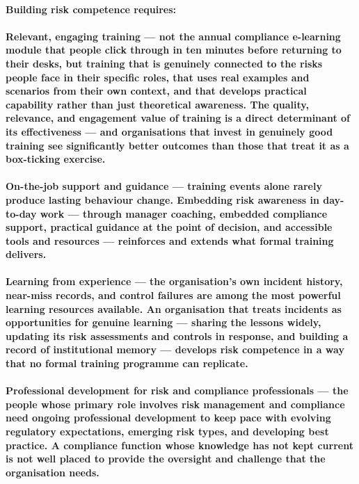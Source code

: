 \paragraph{Building risk competence requires:}
\paragraph{\textbf{Relevant, engaging training} — not the annual compliance e-learning module that people click through in ten minutes before returning to their desks, but training that is genuinely connected to the risks people face in their specific roles, that uses real examples and scenarios from their own context, and that develops practical capability rather than just theoretical awareness. The quality, relevance, and engagement value of training is a direct determinant of its effectiveness — and organisations that invest in genuinely good training see significantly better outcomes than those that treat it as a box-ticking exercise.}
\paragraph{\textbf{On-the-job support and guidance} — training events alone rarely produce lasting behaviour change. Embedding risk awareness in day-to-day work — through manager coaching, embedded compliance support, practical guidance at the point of decision, and accessible tools and resources — reinforces and extends what formal training delivers.}
\paragraph{\textbf{Learning from experience} — the organisation's own incident history, near-miss records, and control failures are among the most powerful learning resources available. An organisation that treats incidents as opportunities for genuine learning — sharing the lessons widely, updating its risk assessments and controls in response, and building a record of institutional memory — develops risk competence in a way that no formal training programme can replicate.}
\paragraph{\textbf{Professional development for risk and compliance professionals} — the people whose primary role involves risk management and compliance need ongoing professional development to keep pace with evolving regulatory expectations, emerging risk types, and developing best practice. A compliance function whose knowledge has not kept current is not well placed to provide the oversight and challenge that the organisation needs.}

